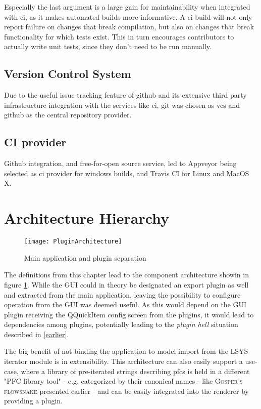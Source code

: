Especially the last argument is a large gain for maintainability when integrated with \gls{ci}, as it makes automated builds more informative.
A \gls{ci} build will not only report failure on changes that break compilation, but also on changes that break functionality for which tests exist. This in turn encourages contributors to actually write unit tests, since they don't need to be run manually.


\subsection{Version Control System}
Due to the useful issue tracking feature of github and its extensive third party infrastructure integration with the services like \gls{ci}, git was chosen as \gls{vcs} and github as the central repository provider.

\subsection{CI provider}
Github integration, and free-for-open source service, led to Appveyor being selected as \gls{ci} provider for windows builds, and Travis CI for Linux and MacOS X.

\section{Architecture Hierarchy}
\begin{figure}
	\texttt{[image: PluginArchitecture]}
	\caption{Main application and plugin separation}
	\label{fig:comp}
\end{figure}

The definitions from this chapter lead to the component architecture showin in figure \ref{fig:comp}. While the GUI could in theory be designated an export plugin as well and extracted from the main application, leaving the possibility to configure operation from the GUI was deemed useful. As this would depend on the GUI plugin receiving the QQuickItem config screen from the plugins, it would lead to dependencies among plugins, potentially leading to the \textit{plugin hell} situation described in \ref{earlier}.

The big benefit of not binding the application to model import from the LSYS iterator module is in extensibility. This architecture can also easily support a use-case, where a library of pre-iterated strings describing \gls{pfc}s is held in a different "PFC library tool" - e.g. categorized by their canonical names - like \textsc{Gosper's flowsnake} presented earlier - and can be easily integrated into the renderer by providing a plugin.
